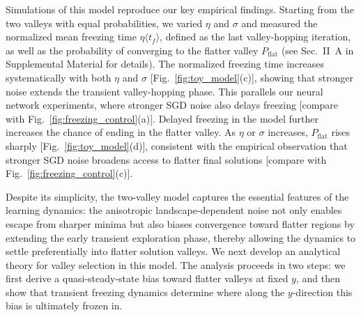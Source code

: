 \documentclass[aps,prx,reprint,superscriptaddress,longbibliography,nofootinbib,floatfix]{revtex4-2}
\begin{document}
Simulations of this model reproduce our key empirical findings. Starting from the two valleys with equal probabilities, we varied $\eta$ and $\sigma$ and measured the normalized mean freezing time $\eta \langle t_f \rangle$, defined as the last valley-hopping iteration, as well as the probability of converging to the flatter valley $P_{\mathrm{flat}}$ (see Sec.~II~A in Supplemental Material for details). The normalized freezing time increases systematically with both $\eta$ and $\sigma$ [Fig.~\ref{fig:toy_model}(c)], showing that stronger noise extends the transient valley-hopping phase. This parallels our neural network experiments, where stronger SGD noise also delays freezing [compare with Fig.~\ref{fig:freezing_control}(a)].
Delayed freezing in the model further increases the chance of ending in the flatter valley. As $\eta$ or $\sigma$ increases, $P_{\mathrm{flat}}$ rises sharply [Fig.~\ref{fig:toy_model}(d)], consistent with the empirical observation that stronger SGD noise broadens access to flatter final solutions [compare with Fig.~\ref{fig:freezing_control}(c)].


Despite its simplicity, the two-valley model captures the essential features of the learning dynamics: the anisotropic landscape-dependent noise not only enables escape from sharper minima but also biases convergence toward flatter regions by extending the early transient exploration phase, thereby allowing the dynamics to settle preferentially into flatter solution valleys. We next develop an analytical theory for valley selection in this model. The analysis proceeds in two steps: we first derive a quasi-steady-state bias toward flatter valleys at fixed $y$, and then show that transient freezing dynamics determine where along the $y$-direction this bias is ultimately frozen in.
\end{document}
